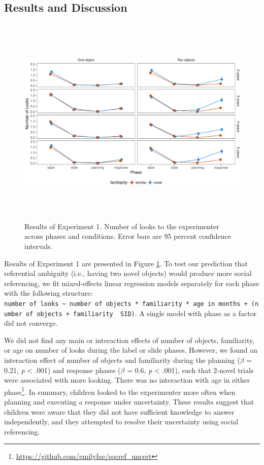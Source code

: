 \documentclass[10pt, letterpaper]{article}
\newenvironment{CodeChunk}{}{}
\begin{document}
\subsection{Results and Discussion}\label{results-and-discussion}

\begin{CodeChunk}
\begin{figure}[h]

{\centering \includegraphics[width=6.5in,height=4in]{figs/results_e1-1} 

}

\caption[Results of Experiment 1]{Results of Experiment 1. Number of looks to the experimenter across phases and conditions. Error bars are 95 percent confidence intervals.}\label{fig:results_e1}
\end{figure}
\end{CodeChunk}

Results of Experiment 1 are presented in Figure \ref{fig:results_e1}. To
test our prediction that referential ambiguity (i.e., having two novel
objects) would produce more social referencing, we fit mixed-effects
linear regression models separately for each phase with the following
structure:
\texttt{number\ of\ looks\ \textasciitilde{}\ number\ of\ objects\ *\ familiarity\ *\ age\ in\ months\ +\ (number\ of\ objects\ +\ familiarity\ \textbar{}\ SID)}.
A single model with phase as a factor did not converge.

We did not find any main or interaction effects of number of objects,
familiarity, or age on number of looks during the label or slide phases.
However, we found an interaction effect of number of objects and
familiarity during the planning (\(\beta\) = 0.21, \emph{p} \textless{}
.001) and response phases (\(\beta\) = 0.6, \emph{p} \textless{} .001),
such that 2-novel trials were associated with more looking. There was no
interaction with age in either phase\footnote{\url{https://github.com/emilyfae/socref_uncert}}.
In summary, children looked to the experimenter more often when planning
and executing a response under uncertainty. These results suggest that
children were aware that they did not have sufficient knowledge to
answer independently, and they attempted to resolve their uncertainty
using social referencing.
\end{document}
